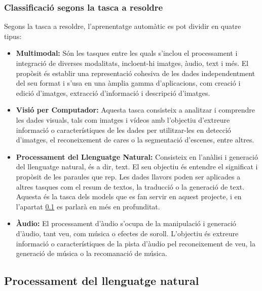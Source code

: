 \subsubsection{Classificació segons la tasca a resoldre}
Segons la tasca a resoldre, l'aprenentatge automàtic es pot dividir en quatre tipus: 
\begin{itemize}
    \item \textbf{Multimodal:} Són les tasques entre les quals s'inclou el processament i integració de diverses modalitats, incloent-hi imatges, àudio, text i més. El propòsit és establir una representació cohesiva de les dades independentment del seu format i s'usa en una àmplia gamma d'aplicacions, com creació i edició d'imatges, extracció d'informació i descripció d'imatges.
    \item \textbf{Visió per Computador:} Aquesta tasca consisteix a analitzar i comprendre les dades visuals, tals com imatges i vídeos amb l'objectiu d'extreure informació o característiques de les dades per utilitzar-les en detecció d'imatges, el reconeixement de cares o la segmentació d'escenes, entre altres.
    \item \textbf{Processament del Llenguatge Natural:} Consisteix en l'anàlisi i generació del llenguatge natural, és a dir, text. El seu objectiu és entendre el significat i propòsit de les paraules que rep. Les dades llavors poden ser aplicades a altres tasques com el resum de textos, la traducció o la generació de text. Aquesta és la tasca dels models que es fan servir en aquest projecte, i en l'apartat \ref{ssec:definicio_NLP} es parlarà en més en profunditat.
    \item \textbf{Àudio:} El processament d'àudio s'ocupa de la manipulació i generació d'àudio, tant veu, com música o efectes de soroll. L'objectiu és extreure informació o característiques de la pista d'àudio pel reconeixement de veu, la generació de música o la recomanació de música. 
\end{itemize}

\subsection{Processament del llenguatge natural} \label{ssec:definicio_NLP}

